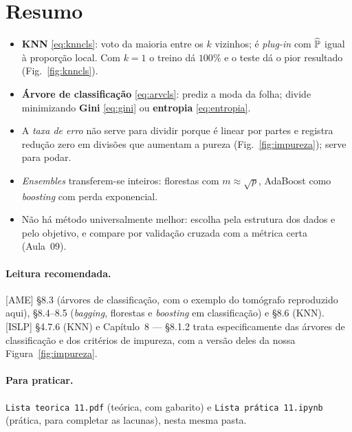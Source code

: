 \documentclass[11pt,a4paper]{article}
\begin{document}
\section*{Resumo}
\begin{itemize}[leftmargin=1.4cm]
  \item \textbf{KNN} \eqref{eq:knncls}: voto da maioria entre os $k$ vizinhos; é
        \emph{plug-in} com $\widehat{\mathbb{P}}$ igual à proporção local. Com $k=1$ o
        treino dá $100\%$ e o teste dá o pior resultado (Fig.~\ref{fig:knncls}).
  \item \textbf{Árvore de classificação} \eqref{eq:arvcls}: prediz a moda da folha;
        divide minimizando \textbf{Gini} \eqref{eq:gini} ou \textbf{entropia}
        \eqref{eq:entropia}.
  \item A \emph{taxa de erro} não serve para dividir porque é linear por partes e
        registra redução zero em divisões que aumentam a pureza
        (Fig.~\ref{fig:impureza}); serve para podar.
  \item \emph{Ensembles} transferem-se inteiros: florestas com $m\approx\sqrt p$,
        AdaBoost como \emph{boosting} com perda exponencial.
  \item Não há método universalmente melhor: escolha pela estrutura dos dados e
        pelo objetivo, e compare por validação cruzada com a métrica certa
        (Aula~09).
\end{itemize}

\paragraph{Leitura recomendada.} [AME] §8.3 (árvores de classificação, com o
exemplo do tomógrafo reproduzido aqui), §8.4--8.5 (\emph{bagging}, florestas e
\emph{boosting} em classificação) e §8.6 (KNN). [ISLP] §4.7.6 (KNN) e Capítulo~8
--- §8.1.2 trata especificamente das árvores de classificação e dos critérios de
impureza, com a versão deles da nossa Figura~\ref{fig:impureza}.

\paragraph{Para praticar.} \texttt{Lista teorica 11.pdf} (teórica, com gabarito) e \texttt{Lista prática 11.ipynb} (prática, para completar as lacunas), nesta mesma pasta.
\end{document}
